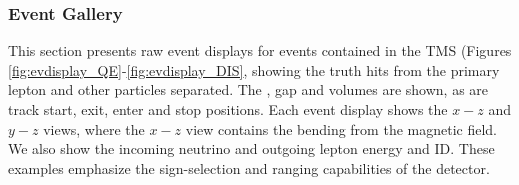 \subsubsection{Event Gallery}
This section presents raw event displays for events contained in the TMS (Figures \ref{fig:evdisplay_QE}-\ref{fig:evdisplay_DIS}, showing the truth hits from the primary lepton and other particles separated. The , gap and  volumes are shown, as are track start, exit, enter and stop positions. Each event display shows the $x-z$ and $y-z$ views, where the $x-z$ view contains the bending from the magnetic field. We also show the incoming neutrino and outgoing lepton energy and ID. These examples emphasize the sign-selection and ranging capabilities of the detector.

